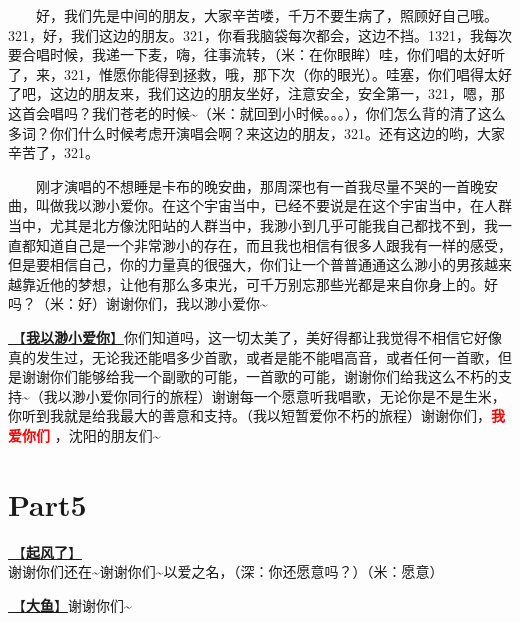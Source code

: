 \documentclass[]{ctexbook}
\begin{document}
  好，我们先是中间的朋友，大家辛苦喽，千万不要生病了，照顾好自己哦。321，好，我们这边的朋友。321，你看我脑袋每次都会，这边不挡。1321，我每次要合唱时候，我递一下麦，嗨，往事流转，（米：在你眼眸）哇，你们唱的太好听了，来，321，惟愿你能得到拯救，哦，那下次（你的眼光）。哇塞，你们唱得太好了吧，这边的朋友来，我们这边的朋友坐好，注意安全，安全第一，321，嗯，那这首会唱吗？我们苍老的时候\textasciitilde（米：就回到小时候。。。），你们怎么背的清了这么多词？你们什么时候考虑开演唱会啊？来这边的朋友，321。还有这边的哟，大家辛苦了，321。

  刚才演唱的不想睡是卡布的晚安曲，那周深也有一首我尽量不哭的一首晚安曲，叫做我以渺小爱你。在这个宇宙当中，已经不要说是在这个宇宙当中，在人群当中，尤其是北方像沈阳站的人群当中，我渺小到几乎可能我自己都找不到，我一直都知道自己是一个非常渺小的存在，而且我也相信有很多人跟我有一样的感受，但是要相信自己，你的力量真的很强大，你们让一个普普通通这么渺小的男孩越来越靠近他的梦想，让他有那么多束光，可千万别忘那些光都是来自你身上的。好吗？（米：好）谢谢你们，我以渺小爱你\textasciitilde{}

\hyperref[loving-you-in-my-humble-way]{🎵【\textbf{我以渺小爱你}】}你们知道吗，这一切太美了，美好得都让我觉得不相信它好像真的发生过，无论我还能唱多少首歌，或者是能不能唱高音，或者任何一首歌，但是谢谢你们能够给我一个副歌的可能，一首歌的可能，谢谢你们给我这么不朽的支持\textasciitilde（我以渺小爱你同行的旅程）谢谢每一个愿意听我唱歌，无论你是不是生米，你听到我就是给我最大的善意和支持。（我以短暂爱你不朽的旅程）谢谢你们，\textbf{\textcolor{red}{我爱你们} }，沈阳的朋友们\textasciitilde{}

\section{Part5}\label{shenyang-20240907-part5}

\hyperref[the-wind-rises]{🎵【\textbf{起风了}】}谢谢你们还在\textasciitilde 谢谢你们\textasciitilde 以爱之名，（深：你还愿意吗？）（米：愿意）

\hyperref[big-fish]{🎵【\textbf{大鱼}】}谢谢你们\textasciitilde{}
\end{document}
